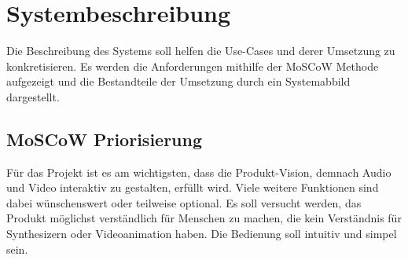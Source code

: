 \documentclass[12pt]{scrartcl}%
\theoremstyle{nonumberplain}
\begin{document}
\section{Systembeschreibung}

Die Beschreibung des Systems soll helfen die Use-Cases und derer Umsetzung zu konkretisieren. Es werden die Anforderungen mithilfe der MoSCoW Methode aufgezeigt und die Bestandteile der Umsetzung durch ein Systemabbild dargestellt.

\subsection{MoSCoW Priorisierung}

Für das Projekt ist es am wichtigsten, dass die Produkt-Vision, demnach Audio und Video interaktiv zu gestalten, erfüllt wird. Viele weitere Funktionen sind dabei wünschenswert oder teilweise optional.
Es soll versucht werden, das Produkt möglichst verständlich für Menschen zu machen, die kein Verständnis für Synthesizern oder Videoanimation haben. Die Bedienung soll intuitiv und simpel sein.
\end{document}
